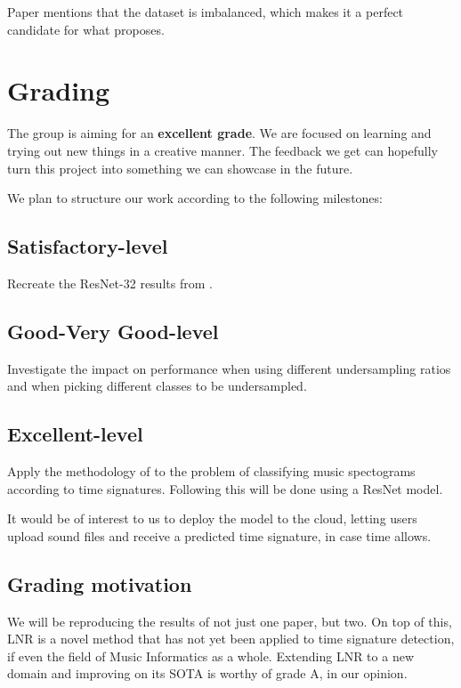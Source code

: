 \documentclass{article}
\begin{document}
Paper \cite{timesig_resnet18} mentions that the dataset is imbalanced, which makes it a perfect candidate for what \cite{ben_labels} proposes.


\section{Grading}
The group is aiming for an \textbf{excellent grade}. We are focused on learning and trying out new things in a creative manner. The feedback we get can hopefully turn this project into something we can showcase in the future.

\noindent We plan to structure our work according to the following milestones:

\subsection{Satisfactory-level}
Recreate the ResNet-32 results from \cite{ben_labels}. 

\subsection{Good-Very Good-level}
Investigate the impact on performance when using different undersampling ratios and when picking different classes to be undersampled.

\subsection{Excellent-level}
Apply the methodology of \cite{ben_labels} to the problem of classifying music spectograms according to time signatures. Following \cite{timesig_resnet18} this will be done using a ResNet model.

It would be of interest to us to deploy the model to the cloud, letting users upload sound files and receive a predicted time signature, in case time allows.


\subsection{Grading motivation}
We will be reproducing the results of not just one paper, but two. On top of this, LNR is a novel method that has not yet been applied to time signature detection, if even the field of Music Informatics as a whole. Extending LNR to a new domain and improving on its SOTA is worthy of grade A, in our opinion.
\end{document}

